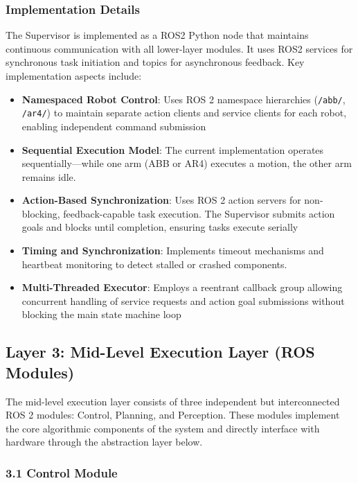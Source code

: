 \subsubsection{Implementation Details}
The Supervisor is implemented as a ROS2 Python node that maintains continuous communication with all lower-layer modules. It uses ROS2 services for synchronous task initiation and topics for asynchronous feedback. Key implementation aspects include:

\begin{itemize}
    \item \textbf{Namespaced Robot Control}: Uses ROS 2 namespace hierarchies (\texttt{/abb/}, \texttt{/ar4/}) to maintain separate action clients and service clients for each robot, enabling independent command submission
    
    \item \textbf{Sequential Execution Model}: The current implementation operates sequentially—while one arm (ABB or AR4) executes a motion, the other arm remains idle.
    
    \item \textbf{Action-Based Synchronization}: Uses ROS 2 action servers for non-blocking, feedback-capable task execution. The Supervisor submits action goals and blocks until completion, ensuring tasks execute serially
    
    \item \textbf{Timing and Synchronization}: Implements timeout mechanisms and heartbeat monitoring to detect stalled or crashed components.
    
    \item \textbf{Multi-Threaded Executor}: Employs a reentrant callback group allowing concurrent handling of service requests and action goal submissions without blocking the main state machine loop
\end{itemize}

\subsection{Layer 3: Mid-Level Execution Layer (ROS Modules)}
\label{subsec:ros_layer}

The mid-level execution layer consists of three independent but interconnected ROS 2 modules: Control, Planning, and Perception. These modules implement the core algorithmic components of the system and directly interface with hardware through the abstraction layer below.

\subsubsection{3.1 Control Module}
\label{subsubsec:control_module}

